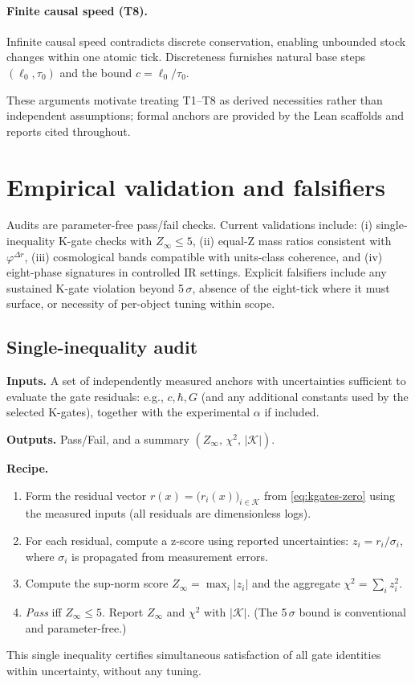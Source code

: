 \documentclass[11pt]{article}
\begin{document}
\paragraph{Finite causal speed (T8).} Infinite causal speed contradicts discrete conservation, enabling unbounded stock changes within one atomic tick. Discreteness furnishes natural base steps \((\ell_0,\tau_0)\) and the bound \(c=\ell_0/\tau_0\).

These arguments motivate treating T1--T8 as derived necessities rather than independent assumptions; formal anchors are provided by the Lean scaffolds and reports cited throughout.

\section{Empirical validation and falsifiers}\label{sec:empirical}
Audits are parameter\mbox{-}free pass/fail checks. Current validations include: (i) single\mbox{-}inequality K\mbox{-}gate checks with \(Z_\infty\le 5\), (ii) equal\mbox{-}Z mass ratios consistent with \(\varphi^{\Delta r}\), (iii) cosmological bands compatible with units\mbox{-}class coherence, and (iv) eight\mbox{-}phase signatures in controlled IR settings. Explicit falsifiers include any sustained K\mbox{-}gate violation beyond 5\,\(\sigma\), absence of the eight\mbox{-}tick where it must surface, or necessity of per\mbox{-}object tuning within scope.

\subsection{Single\mbox{-}inequality audit}
\textbf{Inputs.} A set of independently measured anchors with uncertainties sufficient to evaluate the gate residuals: e.g., \(c,\hbar,G\) (and any additional constants used by the selected K\mbox{-}gates), together with the experimental \(\alpha\) if included.

\textbf{Outputs.} Pass/Fail, and a summary \((Z_\infty,\, \chi^2,\, |\mathcal{K}|)\).

\textbf{Recipe.}
\begin{enumerate}
  \item Form the residual vector \(r(x)=\bigl(r_i(x)\bigr)_{i\in\mathcal{K}}\) from \eqref{eq:kgates-zero} using the measured inputs (all residuals are dimensionless logs).
  \item For each residual, compute a z\mbox{-}score using reported uncertainties: \(z_i = r_i/\sigma_i\), where \(\sigma_i\) is propagated from measurement errors.
  \item Compute the sup\mbox{-}norm score \(Z_\infty=\max_i |z_i|\) and the aggregate \(\chi^2=\sum_i z_i^2\).
  \item \emph{Pass} iff \(Z_\infty \le 5\). Report \(Z_\infty\) and \(\chi^2\) with \(|\mathcal{K}|\). (The 5\,\(\sigma\) bound is conventional and parameter\mbox{-}free.)
\end{enumerate}
This single inequality certifies simultaneous satisfaction of all gate identities within uncertainty, without any tuning.
\end{document}

